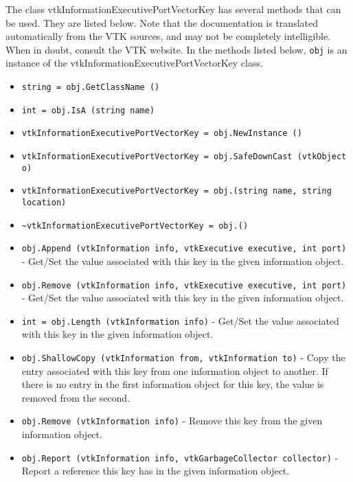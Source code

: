 The class vtkInformationExecutivePortVectorKey has several methods that can be used.
  They are listed below.
Note that the documentation is translated automatically from the VTK sources,
and may not be completely intelligible.  When in doubt, consult the VTK website.
In the methods listed below, \verb|obj| is an instance of the vtkInformationExecutivePortVectorKey class.
\begin{itemize}
\item  \verb|string = obj.GetClassName ()|

\item  \verb|int = obj.IsA (string name)|

\item  \verb|vtkInformationExecutivePortVectorKey = obj.NewInstance ()|

\item  \verb|vtkInformationExecutivePortVectorKey = obj.SafeDownCast (vtkObject o)|

\item  \verb|vtkInformationExecutivePortVectorKey = obj.(string name, string location)|

\item  \verb|~vtkInformationExecutivePortVectorKey = obj.()|

\item  \verb|obj.Append (vtkInformation info, vtkExecutive executive, int port)| -  Get/Set the value associated with this key in the given
 information object.

\item  \verb|obj.Remove (vtkInformation info, vtkExecutive executive, int port)| -  Get/Set the value associated with this key in the given
 information object.

\item  \verb|int = obj.Length (vtkInformation info)| -  Get/Set the value associated with this key in the given
 information object.

\item  \verb|obj.ShallowCopy (vtkInformation from, vtkInformation to)| -  Copy the entry associated with this key from one information
 object to another.  If there is no entry in the first information
 object for this key, the value is removed from the second.

\item  \verb|obj.Remove (vtkInformation info)| -  Remove this key from the given information object.

\item  \verb|obj.Report (vtkInformation info, vtkGarbageCollector collector)| -  Report a reference this key has in the given information object.

\end{itemize}
